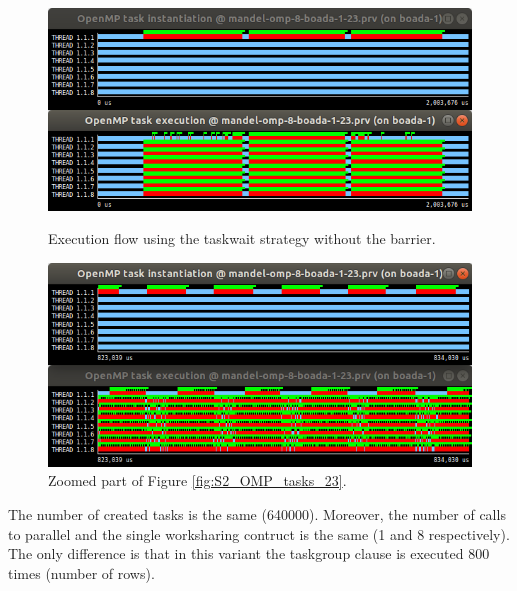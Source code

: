 \documentclass[12pt, a4paper]{article}
\begin{document}
\begin{figure}[H]
\begin{minipage}[t]{0.5\linewidth}
  \centering
  \includegraphics[scale=0.345]{./S2_OMP_tasks_23}
  \caption{Execution flow using the taskwait strategy without the barrier.}
  \label{fig:S2_OMP_tasks_23}
\end{minipage}%
\hspace{0cm}
\begin{minipage}[t]{0.5\linewidth}
  \centering
  \includegraphics[scale=0.345]{./S2_OMP_tasks_23_zoom}
  \caption{Zoomed part of Figure \ref{fig:S2_OMP_tasks_23}.}
  \label{fig:S2_OMP_tasks_23_zoom}
\end{minipage}
\end{figure}

The number of created tasks is the same (640000). Moreover, the number of calls to parallel and the single worksharing contruct is the same (1 and 8 respectively). The only difference is that in this variant the taskgroup clause is executed 800 times (number of rows).
\end{document}
